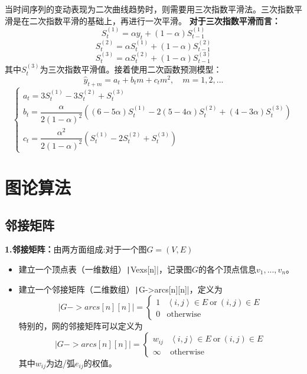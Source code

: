\documentclass[11pt,a4paper]{article}
\begin{document}
\indent\setlength{\parindent}{2em}当时间序列的变动表现为二次曲线趋势时，则需要用三次指数平滑法。三次指数平滑是在二次指数平滑的基础上，再进行一次平滑。
\indent\setlength{\parindent}{2em}\textbf{对于三次指数平滑而言：}
\begin{equation*}
	S_t^{(1)}=\alpha y_t+(1-\alpha)S_{t-1}^{(1)}
\end{equation*}
\begin{equation*}
	S_t^{(2)}=\alpha S_t^{(1)}+(1-\alpha)S_{t-1}^{(2)}
\end{equation*}
\begin{equation*}
	S_t^{(3)}=\alpha S_t^{(2)}+(1-\alpha)S_{t-1}^{(3)}
\end{equation*}
其中$S_t^{(3)}$为三次指数平滑值。接着使用二次函数预测模型：\\
\begin{equation*}
	\hat y_{t+m}=a_t+b_t m+c_t m^2, \quad m=1,2,...
\end{equation*}
\begin{equation*}
	\begin{cases}
		a_t=3S_t^{(1)}-3S_t^{(2)}+S_t^{(3)}\\
		b_t=\dfrac{\alpha}{2(1-\alpha)^2}((6-5\alpha)S_t^{(1)}-2(5-4\alpha)S_t^{(2)}+(4-3\alpha)S_t^{(3)})\\
		c_t=\dfrac{\alpha^2}{2(1-\alpha)^2}(S_t^{(1)}-2S_t^{(2)}+S_t^{(3)})
	\end{cases}
\end{equation*}



\newpage
\section{图论算法}
\subsection{邻接矩阵}
\noindent \textbf{1.邻接矩阵：}由两方面组成:对于一个图$G=(V,E)$
\begin{itemize}
	\item 建立一个顶点表（一维数组）\texttt|Vexs[n]|，记录图$G$的各个顶点信息$v_1,...,v_n$。
	\item 建立一个邻接矩阵（二维数组）\texttt|G->arcs[n][n]|，定义为
	\begin{equation*}
		\texttt|G->arcs[n][n]|=\begin{cases}
			1 & \left\langle i,j \right\rangle \in E \ \mathrm{or} \ (i,j)\in E\\
			0 & \mathrm{otherwise}
		\end{cases}
	\end{equation*}
	特别的，网的邻接矩阵可以定义为
	\begin{equation*}
		\texttt|G->arcs[n][n]|=\begin{cases}
			w_{ij} & \left\langle i,j \right\rangle \in E \ \mathrm{or} \ (i,j)\in E\\
			\infty & \mathrm{otherwise}
		\end{cases}
	\end{equation*}
	其中$w_{ij}$为边/弧$e_{ij}$的权值。
\end{itemize}
\end{document}
